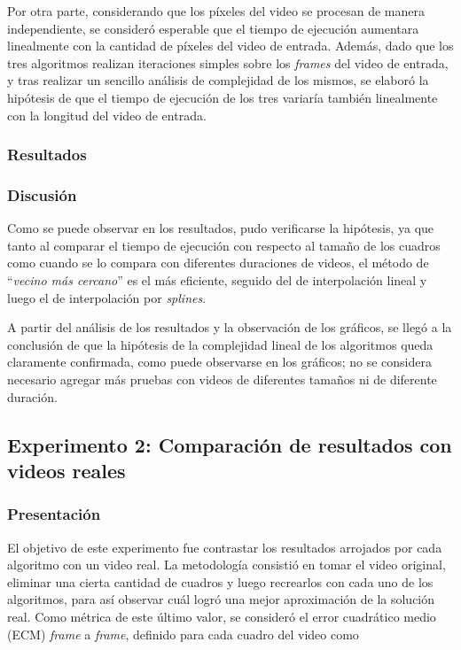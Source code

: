            Por otra parte, considerando que los píxeles del video se procesan de manera independiente, se consideró esperable que el tiempo de ejecución aumentara linealmente con la cantidad de píxeles del video de entrada. Además, dado que los tres algoritmos realizan iteraciones simples sobre los \emph{frames} del video de entrada, y tras realizar un sencillo análisis de complejidad de los mismos, se elaboró la hipótesis de que el tiempo de ejecución de los tres variaría también linealmente con la longitud del video de entrada.

        \subsubsection*{Resultados}

        \subsubsection*{Discusión}

            Como se puede observar en los resultados, pudo verificarse la hipótesis, ya que tanto al comparar el tiempo de ejecución con respecto al tamaño de los cuadros como cuando se lo compara con diferentes duraciones de videos, el método de ``\emph{vecino más cercano}'' es el más eficiente, seguido del de interpolación lineal y luego el de interpolación por \emph{splines}.

            A partir del análisis de los resultados y la observación de los gráficos, se llegó a la conclusión de que la hipótesis de la complejidad lineal de los algoritmos queda claramente confirmada, como puede observarse en los gráficos; no se considera necesario agregar más pruebas con videos de diferentes tamaños ni de diferente duración.


    \subsection{Experimento 2: Comparación de resultados con videos reales}

        \subsubsection*{Presentación}

            El objetivo de este experimento fue contrastar los resultados arrojados por cada algoritmo con un video real. La metodología consistió en tomar el video original, eliminar una cierta cantidad de cuadros y luego recrearlos con cada uno de los algoritmos, para así observar cuál logró una mejor aproximación de la solución real. Como métrica de este último valor, se consideró el error cuadrático medio (ECM) \emph{frame} a \emph{frame}, definido para cada cuadro del video como

